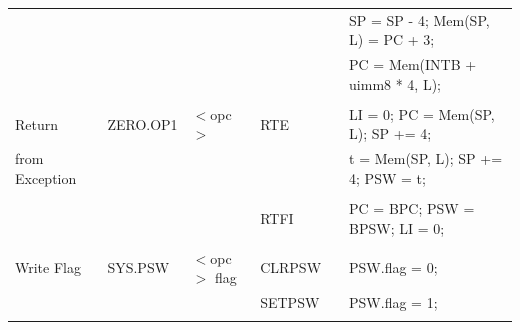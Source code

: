 \begin{table}
\begin{subtable}{\linewidth}
\begin{center}
\begin{tabular}{llllll}
                   &                   &                                       &                   &                   & SP = SP - 4; Mem(SP, L) = PC + 3;                                             \\
                   &                   &                                       &                   &                   & PC = Mem(INTB + uimm8 * 4, L);                                                \\
                   &                   &                                       &                   &                   &                                                                               \\
Return             & ZERO.OP1          & $<$opc$>$                             & RTE               & \flags{!!!!}      & LI = 0; PC = Mem(SP, L); SP += 4;                                             \\
from Exception     &                   &                                       &                   &                   & t = Mem(SP, L); SP += 4; PSW = t;                                             \\
                   &                   &                                       &                   &                   &                                                                               \\
                   &                   &                                       & RTFI              & \flags{!!!!}      & PC = BPC; PSW = BPSW; LI = 0;                                                 \\
                   &                   &                                       &                   &                   &                                                                               \\
Write Flag         & SYS.PSW           & $<$opc$>$ flag                        & CLRPSW            & \flags{!!!!}      & PSW.flag = 0;                                                                 \\
                   &                   &                                       & SETPSW            & \flags{!!!!}      & PSW.flag = 1;                                                                 \\
                   &                   &                                       &                   &                   &                                                                               \\

\end{tabular}
\end{center}
\end{subtable}
\end{table}
